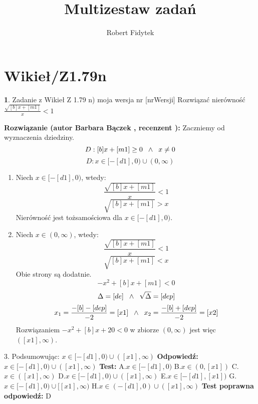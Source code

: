 \documentclass[12pt, a4paper]{article}
\title{Multizestaw zadań}
\author{Robert Fidytek}
\date{}
\theoremstyle{definition} %
\newtheorem{zad}{}
\newcommand{\kategoria}[1]{\section{#1}} %
\newcommand{\zadStart}[1]{\begin{zad}#1\newline} %
\newcommand{\zadStop}{\end{zad}}   %
\newcommand{\rozwStart}[2]{\noindent \textbf{Rozwiązanie (autor #1 , recenzent #2): }\newline} %
\newcommand{\rozwStop}{\newline}                                            %
\newcommand{\odpStart}{\noindent \textbf{Odpowiedź:}\newline}    %
\newcommand{\odpStop}{\newline}                                             %
\newcommand{\testStart}{\noindent \textbf{Test:}\newline} %
\newcommand{\testStop}{\newline} %
\newcommand{\kluczStart}{\noindent \textbf{Test poprawna odpowiedź:}\newline} %
\newcommand{\kluczStop}{\newline} %
\begin{document}
\maketitle


\kategoria{Wikieł/Z1.79n}
\zadStart{Zadanie z Wikieł Z 1.79 n) moja wersja nr [nrWersji]}
Rozwiązać nierówność $\frac{\sqrt{[b]x+[m1]}}{x}<1$
\zadStop
\rozwStart{Barbara Bączek}{}
Zaczniemy od wyznaczenia dziedziny.
$$D:[b]x+[m1] \geq 0 \hspace{0.2 cm} \wedge \hspace{0.2 cm} x \ne 0$$
$$D: x \in [ -[d1], 0) \cup (0, \infty)$$
\begin{enumerate}
\item Niech $x \in [-[d1], 0)$, wtedy:
$$\frac{\sqrt{[b]x+[m1]}}{x}<1$$
$$\sqrt{[b]x+[m1]}>x$$
Nierówność jest tożsamościowa dla $x \in [-[d1], 0)$.
\item  Niech $x \in (0, \infty)$, wtedy:
$$\frac{\sqrt{[b]x+[m1]}}{x}<1$$
$$\sqrt{[b]x+[m1]}<x$$
Obie strony są dodatnie.
$$-x^2 + [b]x+ [m1]<0$$
$$\Delta = [de] \hspace{0.2 cm} \wedge \hspace{0.2 cm} \sqrt{\Delta}= [dep]$$
$$x_1 = \frac{-[b]-[dep]}{-2}=[x1]  \hspace{0.2 cm} \wedge \hspace{0.2 cm} x_2 = \frac{-[b]+[dep]}{-2}=[x2]$$
Rozwiązaniem $-x^2+[b]x+20<0$ w zbiorze $(0, \infty)$ jest więc $([x1], \infty)$.
\end{enumerate}
3. Podsumowując: $x \in [-[d1],0) \cup ([x1], \infty)$
\rozwStop
\odpStart
$x \in [-[d1],0) \cup ([x1], \infty)$
\odpStop
\testStart
A.$x \in [-[d1],0)$
B.$x \in (0,[x1])$
C.$x \in ([x1], \infty)$
D.$x \in [-[d1],0) \cup ([x1], \infty)$
E.$x \in [-[d1],[x1])$
G.$x \in [-[d1],0) \cup [[x1], \infty)$
H.$x \in (-[d1],0) \cup ([x1], \infty)$
\testStop
\kluczStart
D
\kluczStop
\end{document}
